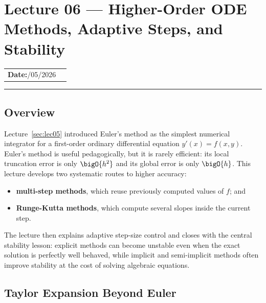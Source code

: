 
\section{Lecture 06 — Higher-Order ODE Methods, Adaptive Steps, and
  Stability}\label{sec:lec06}

\begin{center}
\begin{tabular}{ll}
  \textbf{Date:}\quad 03/05/2026 & \\
\end{tabular}
\end{center}
\hrule\vspace{1.5em}

\subsection*{Overview}
Lecture~\ref{sec:lec05} introduced Euler's method as the simplest numerical
integrator for a first-order ordinary differential equation
$y'(x)=f(x,y)$. Euler's method is useful pedagogically, but it is rarely
efficient: its local truncation error is only $\bigO{h^2}$ and its global
error is only $\bigO{h}$. This lecture develops two systematic routes to
higher accuracy:
\begin{itemize}
    \item \textbf{multi-step methods}, which reuse previously computed values
    of $f$; and
    \item \textbf{Runge-Kutta methods}, which compute several slopes inside
    the current step.
\end{itemize}
The lecture then explains adaptive step-size control and closes with the
central stability lesson: explicit methods can become unstable even when the
exact solution is perfectly well behaved, while implicit and semi-implicit
methods often improve stability at the cost of solving algebraic equations.

\subsection{Taylor Expansion Beyond Euler}\label{subsec:lec06:taylor}

